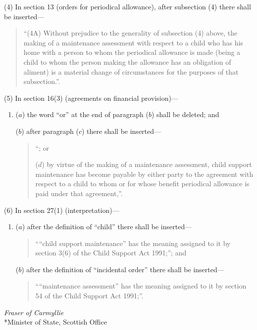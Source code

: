 \documentclass[a4paper]{article}
\begin{document}
(4) In section 13 (orders for periodical allowance), after subsection (4) there shall be inserted—
\begin{quotation}
“(4A) Without prejudice to the generality of subsection (4) above, the making of a maintenance assessment with respect to a child who has his home with a person to whom the periodical allowance is made (being a child to whom the person making the allowance has an obligation of aliment) is a material change of circumstances for the purposes of that subsection.”.
\end{quotation}

(5) In section 16(3) (agreements on financial provision)—
\begin{enumerate}\item[]
($a$) the word “or” at the end of paragraph ($b$) shall be deleted; and

($b$) after paragraph ($c$) there shall be inserted—
\begin{quotation}
“; or

($d$) by virtue of the making of a maintenance assessment, child support maintenance has become payable by either party to the agreement with respect to a child to whom or for whose benefit periodical allowance is paid under that agreement,”.
\end{quotation}
\end{enumerate}

(6) In section 27(1) (interpretation)—
\begin{enumerate}\item[]
($a$) after the definition of “child” there shall be inserted—
\begin{quotation}
““child support maintenance” has the meaning assigned to it by section 3(6) of the Child Support Act 1991;”; and
\end{quotation}

($b$) after the definition of “incidental order” there shall be inserted—
\begin{quotation}
““maintenance assessment” has the meaning assigned to it by section 54 of the Child Support Act 1991;”.
\end{quotation}
\end{enumerate}

\bigskip


{\raggedleft
\emph{Fraser of Carmyllie}\\*Minister of State, Scottish Office

}
\end{document}
